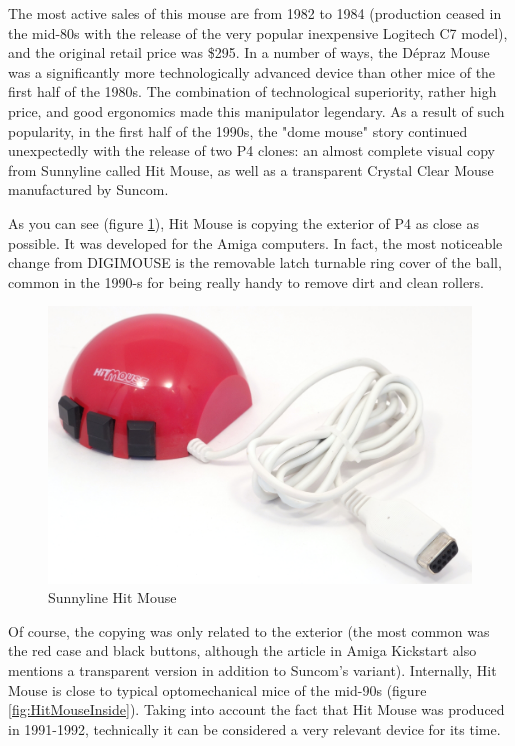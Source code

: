 \documentclass[11pt, a4paper]{article}
\begin{document}
The most active sales of this mouse are from 1982 to 1984 (production ceased in the mid-80s with the release of the very popular inexpensive Logitech C7 model), and the original retail price was \$295. In a number of ways, the Dépraz Mouse was a significantly more technologically advanced device than other mice of the first half of the 1980s. The combination of technological superiority, rather high price, and good ergonomics made this manipulator legendary. As a result of such popularity, in the first half of the 1990s, the "dome mouse" story continued unexpectedly with the release of two P4 clones: an almost complete visual copy from Sunnyline called Hit Mouse\cite{sunnyline}, as well as a transparent Crystal Clear Mouse manufactured by Suncom\cite{suncom}.

As you can see (figure \ref{fig:HitMousePic}), Hit Mouse is copying the exterior of P4 as close as possible. It was developed for the Amiga computers. In fact, the most noticeable change from DIGIMOUSE is the removable latch turnable ring cover of the ball, common in the 1990-s for being really handy to remove dirt and clean rollers.

\begin{figure}[h]
   \centering
    \includegraphics[scale=0.5]{1982_depraz_digimouse/hitmouse_pic_30.jpg}
    \caption{Sunnyline Hit Mouse}
    \label{fig:HitMousePic}
\end{figure}

Of course, the copying was only related to the exterior (the most common was the red case and black buttons, although the article in Amiga Kickstart also mentions \cite{sunnyline} a transparent version in addition to Suncom's variant). Internally, Hit Mouse is close to typical optomechanical mice of the mid-90s (figure \ref{fig:HitMouseInside}). Taking into account the fact that Hit Mouse was produced in 1991-1992, technically it can be considered a very relevant device for its time.
\end{document}

